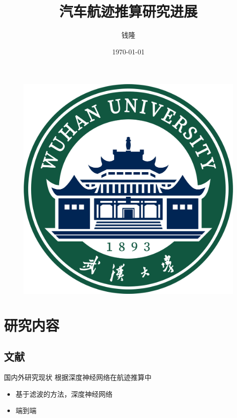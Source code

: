 \documentclass{beamer} %
\title{汽车航迹推算研究进展}
\subtitle{}
\author{钱隆}
\institute{武汉大学测绘遥感信息工程国家重点实验室}
\date{\today}
\begin{document}
\kaishu
\begin{frame} %
    \titlepage
    \begin{figure}[htpb]
        \begin{center}
            \includegraphics[width=0.2\linewidth]{pic/Wuhan_University_Logo.png} %
        \end{center}
    \end{figure}
\end{frame}

\begin{frame}
    \tableofcontents[sectionstyle=show,subsectionstyle=show/shaded/hide,subsubsectionstyle=show/shaded/hide]
\end{frame}


\section{研究内容}

\subsection{文献}

\begin{frame}{国内外研究现状}
    根据深度神经网络在航迹推算中
    \begin{itemize}
        \item 基于滤波的方法，深度神经网络
        \item 端到端
    \end{itemize}
\end{frame}
\end{document}
